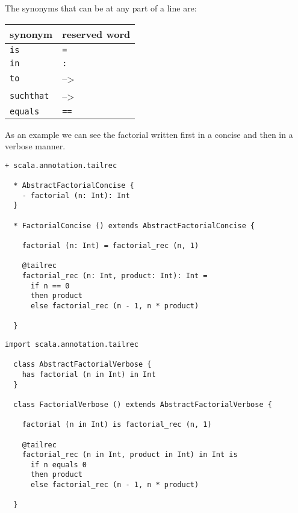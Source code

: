\documentclass[12pt,a4paper]{article}
\newcommand{\srccode}[1]{\texttt{{#1}}}
\newcommand{\reservedWord}[1]{{\color{blue}\srccode{#1}}\xspace}
\newcommand{\sdef}{\srccode{=}}
\newcommand{\scolon}{\srccode{:}}
\newcommand{\sequalsSign}{\srccode{==}}
\newcommand{\sis}{\reservedWord{is}}
\newcommand{\scin}{\reservedWord{in}}
\newcommand{\sto}{\reservedWord{to}}
\newcommand{\ssuchthat}{\reservedWord{suchthat}}
\newcommand{\sequals}{\reservedWord{equals}}
\newcommand{\lambdaSymbol}{{\tiny--\textgreater}}
\begin{document}
    The synonyms that can be at any part of a line are:

    \begin{center}
        \begin{tabular}{|ll|}
            \hline
            \textbf{synonym} & \textbf{reserved word} \\
            \hline
            \sis             & \sdef                  \\
            \hline
            \scin            & \scolon                \\
            \hline
            \sto             & \lambdaSymbol          \\
            \ssuchthat       & \lambdaSymbol          \\
            \hline
            \sequals         & \sequalsSign           \\
            \hline
        \end{tabular}
    \end{center}

    As an example we can see the factorial written first in a concise and then in a verbose manner.

    \begin{lstlisting}[label={lst:exampleFactorialConcise}]
  + scala.annotation.tailrec

  * AbstractFactorialConcise {
    - factorial (n: Int): Int
  }

  * FactorialConcise () extends AbstractFactorialConcise {

    factorial (n: Int) = factorial_rec (n, 1)

    @tailrec
    factorial_rec (n: Int, product: Int): Int =
      if n == 0
      then product
      else factorial_rec (n - 1, n * product)

  }
    \end{lstlisting}


    \begin{lstlisting}[label={lst:exampleFactorialVerbose}]
  import scala.annotation.tailrec

  class AbstractFactorialVerbose {
    has factorial (n in Int) in Int
  }

  class FactorialVerbose () extends AbstractFactorialVerbose {

    factorial (n in Int) is factorial_rec (n, 1)

    @tailrec
    factorial_rec (n in Int, product in Int) in Int is
      if n equals 0
      then product
      else factorial_rec (n - 1, n * product)

  }
    \end{lstlisting}
\end{document}
